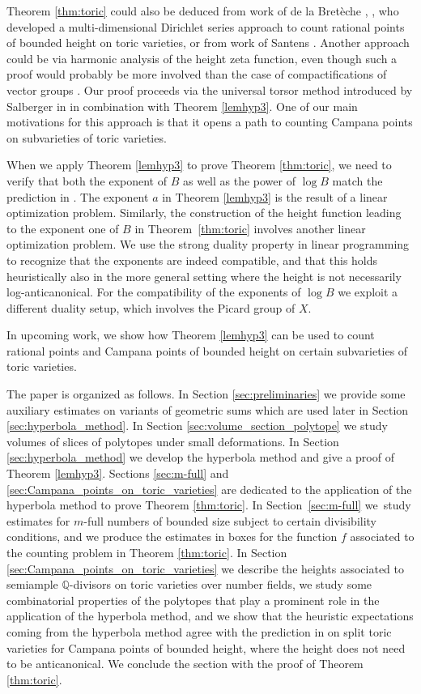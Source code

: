 \documentclass[11pt]{article}
\numberwithin{equation}{section}
\newcommand\QQ{\mathbb{Q}}
\theoremstyle{definition}
\numberwithin{theorem}{section}
\begin{document}
Theorem \ref{thm:toric} could also be deduced from work of de la Bretèche \cite{Bre01a}, \cite{Bre01b}, who developed a multi-dimensional Dirichlet series approach to count rational points of bounded height on toric varieties, or from work of Santens \cite{Santens}. Another approach could be via harmonic analysis of the height zeta function, even though such a proof would probably be more involved than the case of compactifications of vector groups \cite{PSTVA}.
Our proof proceeds via the universal torsor method introduced by Salberger in \cite{MR1679841} in combination with Theorem \ref{lemhyp3}.
One of our main motivations for this approach is that it opens a path to counting Campana points on subvarieties of toric varieties.\par
When we apply Theorem \ref{lemhyp3} to prove Theorem \ref{thm:toric}, we need to verify that both the exponent of $B$ as well as the power of $\log B$ match the prediction in \cite{PSTVA}. The exponent $a$ in Theorem \ref{lemhyp3} is the result of a linear optimization problem. Similarly, the construction of the height function leading to the exponent one of $B$ in Theorem~\ref{thm:toric} involves another linear optimization problem. We use the strong duality property in linear programming \cite[Ch.\,6]{Dantzig} to recognize that the exponents
are indeed compatible, and that this holds heuristically also in the more general setting where the height is not necessarily log-anticanonical. For the compatibility of the exponents of $\log B$ we exploit a different duality setup, which involves the Picard group of $X$.

In upcoming work, we show how Theorem \ref{lemhyp3} can be used to count rational points and Campana points of bounded height on certain subvarieties of toric varieties.

The paper is organized as follows.
In Section \ref{sec:preliminaries} we provide some auxiliary estimates on variants of geometric sums which are used later in Section \ref{sec:hyperbola_method}.
In Section \ref{sec:volume_section_polytope} we study volumes of slices of polytopes under small deformations.
In Section \ref{sec:hyperbola_method} we develop the hyperbola method and give a proof of Theorem \ref{lemhyp3}.
Sections \ref{sec:m-full} and \ref{sec:Campana_points_on_toric_varieties} are dedicated to the application of the hyperbola method to prove Theorem \ref{thm:toric}.
In Section~\ref{sec:m-full} we~study estimates for $m$-full numbers of bounded size subject to certain divisibility conditions, and we produce the estimates in boxes for the function $f$ associated to the counting problem in Theorem \ref{thm:toric}.
In Section \ref{sec:Campana_points_on_toric_varieties} we describe the heights associated to semiample $\QQ$-divisors on toric varieties over number fields, we study some combinatorial properties of the polytopes that play a prominent role in the application of the hyperbola method, and we show that the heuristic expectations coming from the hyperbola method agree with the prediction in \cite[Conj.\,1.1]{PSTVA} on split toric varieties for Campana points of bounded height, where the height does not need to be anticanonical. We conclude the section with the proof of Theorem \ref{thm:toric}.\par
\end{document}
